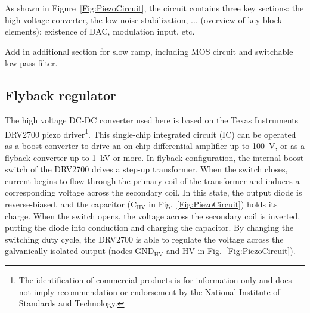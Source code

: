 \documentclass[aip,rsi,reprint]{revtex4-1} %
\begin{document}
As shown in Figure~\ref{Fig:PiezoCircuit}, the circuit contains three key sections: the high voltage converter, the low-noise stabilization, ... (overview of key block elements);  existence of DAC, modulation input, etc.

Add in additional section for slow ramp, including MOS circuit and switchable low-pass filter.

\subsection{Flyback regulator}
\label{Sec:DRV2700}

The high voltage DC-DC converter used here is based on the Texas Instruments DRV2700 piezo driver\footnote{The identification of commercial products is for information only and does not imply recommendation or endorsement by the National Institute of Standards and Technology.}.
This single-chip integrated circuit (IC) can be operated as a boost converter to drive an on-chip differential amplifier up to \SI{100}{\volt}, or as a flyback converter up to \SI{1}{\kilo\volt} or more.
In flyback configuration, the internal-boost switch of the DRV2700 drives a step-up transformer.
When the switch closes, current begins to flow through the primary coil of the transformer and induces a corresponding voltage across the secondary coil.
In this state, the output diode is reverse-biased, and the capacitor ($\text{C}_{\text{HV}}$ in Fig.~\ref{Fig:PiezoCircuit}) holds its charge.
When the switch opens, the voltage across the secondary coil is inverted, putting the diode into conduction and charging the capacitor.
By changing the switching duty cycle, the DRV2700 is able to regulate the voltage across the galvanically isolated output (nodes $\text{GND}_\text{HV}$ and HV in Fig.~\ref{Fig:PiezoCircuit}).
\end{document}
